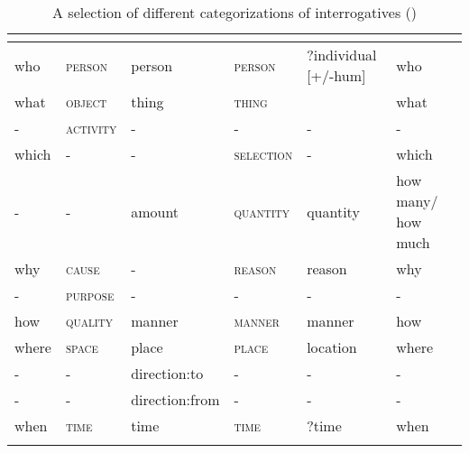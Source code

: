 \begin{table}
\caption{A selection of different categorizations of interrogatives (\citealt{Hölzl2015c})}
\label{tab:4:7}
\small
\begin{tabularx}{\textwidth}{QQQQQQ}
\lsptoprule
\textbf{\citealt{MuyskenSmith1990}} & \textbf{\citealt{Heine1991}} & \textbf{\citealt{Diessel2003}} & \textbf{\citealt{Cysouw2005}} & \textbf{\citealt{Mackenzie2009}} & \textbf{\citealt{Dixon2012}}\\
\midrule
who & \textsc{person} & person & \textsc{person} & ?individual [+/-hum] & who\\
what & \textsc{object} & thing & \textsc{thing} &  & what\\
- & \textsc{activity} & - & \textsc{-} & - & -\\
which & - & - & \textsc{selection} & - & which\\
- & - & amount & \textsc{quantity} & quantity & how many/ how much\\
why & \textsc{cause} & - & \textsc{reason} & reason & why\\
- & \textsc{purpose} & - & \textsc{-} & - & -\\
how & \textsc{quality} & manner & \textsc{manner} & manner & how\\
where & \textsc{space} & place & \textsc{place} & location & where\\
- & - & direction:to & \textsc{-} & - & -\\
- & - & direction:from & \textsc{-} & - & -\\
when & \textsc{time} & time & \textsc{time} & ?time & when\\
\lspbottomrule
\end{tabularx}
\end{table}

